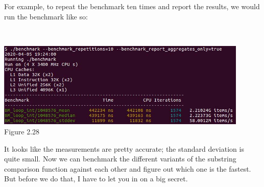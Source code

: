 For example, to repeat the benchmark ten times and report the results, we would run the benchmark like so:

\hspace*{\fill} \\ %
\begin{center}
\includegraphics[width=0.9\textwidth]{content/1/chapter2/images/28.jpg}\\
Figure 2.28
\end{center}

It looks like the measurements are pretty accurate; the standard deviation is quite small. Now we can benchmark the different variants of the substring comparison function against each other and figure out which one is the fastest. But before we do that, I have to let you in on a big secret.

